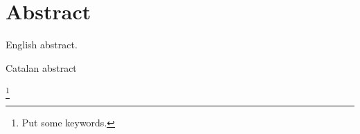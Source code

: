 \thispagestyle{empty}
\makeatletter
\@openrightfalse
\makeatother
\chapter*{Abstract}

\vspace*{-0.2cm}

English abstract.

\vspace*{1.5cm}

Catalan abstract

\vspace*{-0.2cm}


{\let\thefootnote\relax\footnote{Put some keywords.}}
